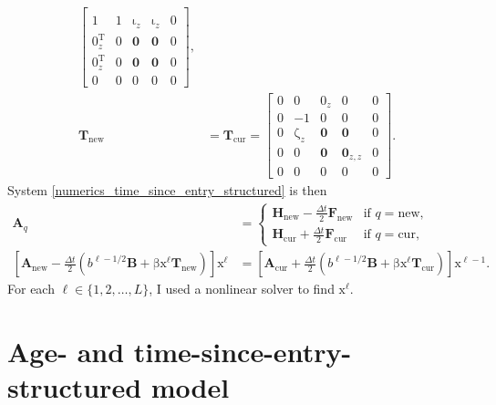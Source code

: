 \documentclass[USenglish]{article}
\renewcommand{\vec}[1]{\boldsymbol{\mathrm{#1}}}
\newcommand{\mat}[1]{\mathbf{#1}}
\begin{document}
\begin{subequations}
\begin{align}
\begin{bmatrix}
      \\
      1 & 1 & \vec{\iota}_z & \vec{\iota}_z & 0
      \\
      \vec{0}_z^{\mathrm{T}} & \vec{0} & \mat{0} & \mat{0} & \vec{0}
      \\
      \vec{0}_z^{\mathrm{T}} & \vec{0} & \mat{0} & \mat{0} & \vec{0}
      \\
      0 & 0 & \vec{0} & \vec{0} & 0
    \end{bmatrix},
    \\
    \mat{T}_{\mathrm{new}} &=
    \mat{T}_{\mathrm{cur}} =
    \begin{bmatrix}
      0 & 0 & \vec{0}_z & \vec{0} & 0
      \\
      0 & - 1 & \vec{0} & \vec{0} & 0
      \\
      \vec{0} & \vec{\zeta}_z & \mat{0} & \mat{0} & \vec{0}
      \\
      \vec{0} & \vec{0} & \mat{0} & \mat{0}_{z,z} & \vec{0}
      \\
      0 & 0 & \vec{0} & \vec{0} & 0
    \end{bmatrix}.
  \end{align}
\end{subequations}
System \eqref{numerics_time_since_entry_structured} is then
\begin{subequations}
  \label{step_time_since_entry_structured}
  \begin{align}
    \mat{A}_q &=
    \begin{cases}
      \mat{H}_{\mathrm{new}} - \frac{\Delta t}{2} \mat{F}_{\mathrm{new}}
      & \text{if $q = \mathrm{new}$},
      \\
      \mat{H}_{\mathrm{cur}} + \frac{\Delta t}{2} \mat{F}_{\mathrm{cur}}
      & \text{if $q = \mathrm{cur}$},
    \end{cases}
    \\
    \left[
      \mat{A}_{\mathrm{new}}
      - \frac{\Delta t}{2} \left(
        b^{\ell - 1 / 2} \mat{B}
        + \vec{\beta} \vec{x}^{\ell} \mat{T}_{\mathrm{new}}
      \right)
    \right]
    \vec{x}^{\ell} &=
    \left[
      \mat{A}_{\mathrm{cur}}
      + \frac{\Delta t}{2} \left(
        b^{\ell - 1 / 2} \mat{B}
        + \vec{\beta} \vec{x}^{\ell} \mat{T}_{\mathrm{cur}}
      \right)
    \right]
    \vec{x}^{\ell - 1}.
  \end{align}
\end{subequations}
For each $\ell \in \{1, 2, \ldots, L\}$, I used a nonlinear
solver to find $\vec{x}^{\ell}$.


\section{Age- and time-since-entry-structured model}
\end{document}
